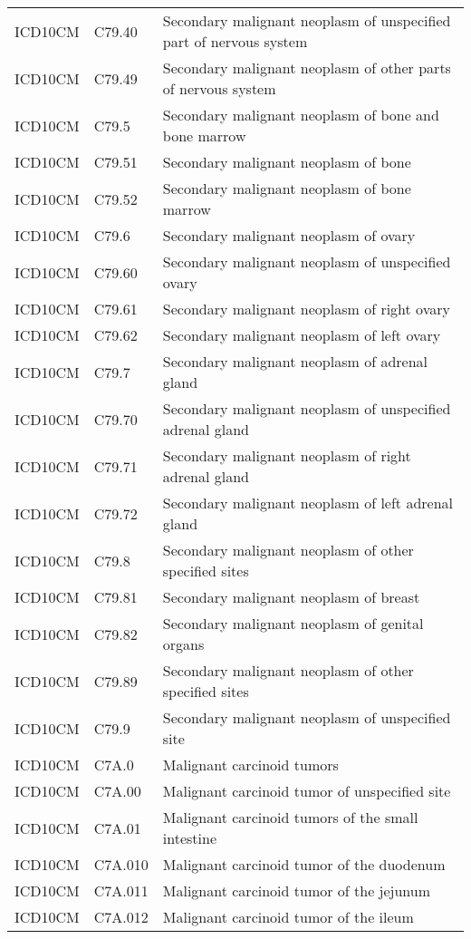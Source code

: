 \begin{longtable}{p{}p{}p{}}
  ICD10CM & C79.40 & Secondary malignant neoplasm of unspecified part of nervous system \\ 
  ICD10CM & C79.49 & Secondary malignant neoplasm of other parts of nervous system \\ 
  ICD10CM & C79.5 & Secondary malignant neoplasm of bone and bone marrow \\ 
  ICD10CM & C79.51 & Secondary malignant neoplasm of bone \\ 
  ICD10CM & C79.52 & Secondary malignant neoplasm of bone marrow \\ 
  ICD10CM & C79.6 & Secondary malignant neoplasm of ovary \\ 
  ICD10CM & C79.60 & Secondary malignant neoplasm of unspecified ovary \\ 
  ICD10CM & C79.61 & Secondary malignant neoplasm of right ovary \\ 
  ICD10CM & C79.62 & Secondary malignant neoplasm of left ovary \\ 
  ICD10CM & C79.7 & Secondary malignant neoplasm of adrenal gland \\ 
  ICD10CM & C79.70 & Secondary malignant neoplasm of unspecified adrenal gland \\ 
  ICD10CM & C79.71 & Secondary malignant neoplasm of right adrenal gland \\ 
  ICD10CM & C79.72 & Secondary malignant neoplasm of left adrenal gland \\ 
  ICD10CM & C79.8 & Secondary malignant neoplasm of other specified sites \\ 
  ICD10CM & C79.81 & Secondary malignant neoplasm of breast \\ 
  ICD10CM & C79.82 & Secondary malignant neoplasm of genital organs \\ 
  ICD10CM & C79.89 & Secondary malignant neoplasm of other specified sites \\ 
  ICD10CM & C79.9 & Secondary malignant neoplasm of unspecified site \\ 
  ICD10CM & C7A.0 & Malignant carcinoid tumors \\ 
  ICD10CM & C7A.00 & Malignant carcinoid tumor of unspecified site \\ 
  ICD10CM & C7A.01 & Malignant carcinoid tumors of the small intestine \\ 
  ICD10CM & C7A.010 & Malignant carcinoid tumor of the duodenum \\ 
  ICD10CM & C7A.011 & Malignant carcinoid tumor of the jejunum \\ 
  ICD10CM & C7A.012 & Malignant carcinoid tumor of the ileum \\ 

\end{longtable}
